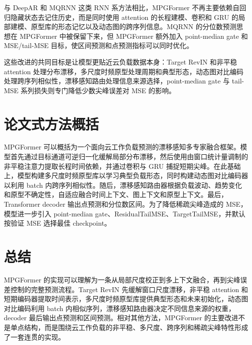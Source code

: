 \documentclass[UTF8,a4paper,11pt]{ctexart}
\begin{document}
与 DeepAR 和 MQRNN 这类 RNN 系方法相比，MPGFormer 不再主要依赖自回归隐藏状态去记住历史，而是同时使用 attention 的长程建模、卷积和 GRU 的局部建模、原型库的形态记忆以及动态图的跨序列信息。MQRNN 的分位数预测思想在 MPGFormer 中被保留下来，但 MPGFormer 额外加入 point-median gate 和 MSE/tail-MSE 目标，使区间预测和点预测指标可以同时优化。

这些改进的共同目标是让模型更贴近云负载数据本身：Target RevIN 和非平稳 attention 处理分布漂移，多尺度时频原型处理周期和典型形态，动态图对比编码处理跨序列相似性，漂移感知路由处理信息来源选择，point-median gate 与 tail-MSE 系列损失则专门降低少数尖峰误差对 MSE 的影响。

\section{论文式方法概括}

MPGFormer 可以概括为一个面向云工作负载预测的漂移感知多专家融合框架。模型首先通过目标通道可逆归一化缓解局部分布漂移，然后使用由窗口统计量调制的非平稳注意力提取长程时间依赖，并通过卷积与 GRU 捕捉短期尖峰。在此基础上，模型构建多尺度时频原型库以学习典型负载形态，同时构建动态图对比编码器以利用 batch 内跨序列相似性。随后，漂移感知路由器根据负载波动、趋势变化和原型不确定性，自适应融合时间上下文、图上下文和原型上下文。最后，Transformer decoder 输出点预测和分位数区间。为了降低稀疏尖峰造成的 MSE，模型进一步引入 point-median gate、ResidualTailMSE、TargetTailMSE，并默认按验证 MSE 选择最佳 checkpoint。

\section{总结}

MPGFormer 的实现可以理解为一条从局部尺度校正到多上下文融合，再到尖峰误差控制的完整预测流程。Target RevIN 先缓解窗口尺度漂移，非平稳 attention 和短期编码器提取时间表示，多尺度时频原型库提供典型形态和未来初始化，动态图对比编码利用 batch 内相似序列，漂移感知路由器决定不同信息来源的权重，decoder 最后输出点预测和区间预测。相对其他方法，MPGFormer 的主要改进不是单点结构，而是围绕云工作负载的非平稳、多尺度、跨序列和稀疏尖峰特性形成了一套连贯的实现。
\end{document}
